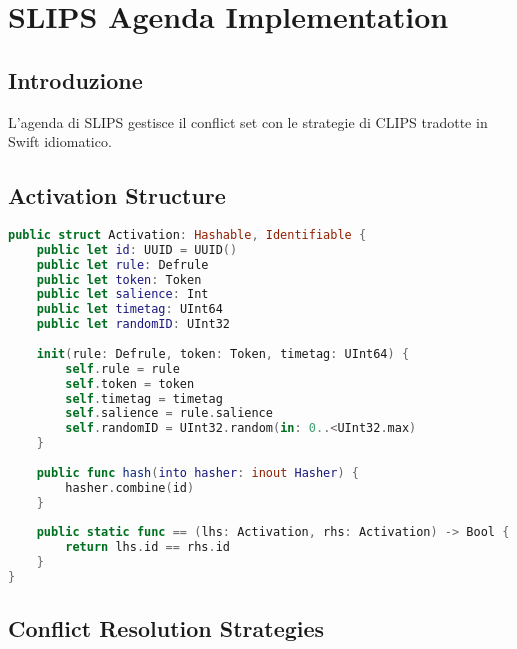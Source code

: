 
\chapter{SLIPS Agenda Implementation}
\label{cap:slips_agenda}

\section{Introduzione}

L'agenda di SLIPS gestisce il conflict set con le strategie di CLIPS tradotte in Swift idiomatico.

\section{Activation Structure}

\begin{lstlisting}[language=Swift]
public struct Activation: Hashable, Identifiable {
    public let id: UUID = UUID()
    public let rule: Defrule
    public let token: Token
    public let salience: Int
    public let timetag: UInt64
    public let randomID: UInt32
    
    init(rule: Defrule, token: Token, timetag: UInt64) {
        self.rule = rule
        self.token = token
        self.timetag = timetag
        self.salience = rule.salience
        self.randomID = UInt32.random(in: 0..<UInt32.max)
    }
    
    public func hash(into hasher: inout Hasher) {
        hasher.combine(id)
    }
    
    public static func == (lhs: Activation, rhs: Activation) -> Bool {
        return lhs.id == rhs.id
    }
}
\end{lstlisting}

\section{Conflict Resolution Strategies}

